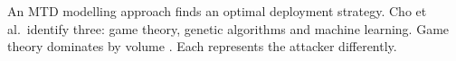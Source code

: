 \documentclass{cshonours}
\begin{document}
An MTD modelling approach finds an optimal deployment
strategy. Cho et al.\ identify three: game theory, genetic algorithms and
machine learning. Game theory dominates by volume \citep{cho2020}.
Each represents the attacker differently.
\end{document}
